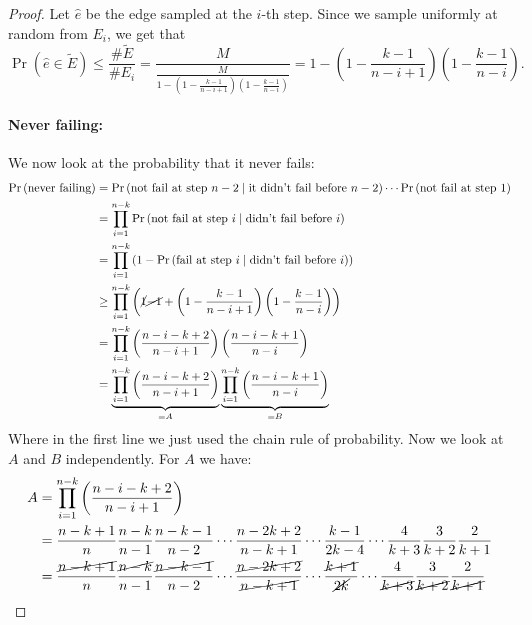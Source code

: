 \documentclass[11pt]{article}
\begin{document}
\begin{enumerate}
\begin{proof}
        Let $\hat e$ be the edge sampled at the $i$-th step. Since we sample uniformly at random from $E_i$, we get that
        \begin{equation*}
            \Pr\left(\hat e \in \tilde E\right) \leq \frac{\#\tilde E}{\# E_i}=\frac{M}{\frac{M}{1-\left(1-\frac{k-1}{n-i+1}\right)\left(1-\frac{k-1}{n-i}\right)}} = 1-\left(1-\frac{k-1}{n-i+1}\right)\left(1-\frac{k-1}{n-i}\right).
        \end{equation*}
        \paragraph*{Never failing:} We now look at the probability that it never fails:
        \begin{align*}
            \Pr\left(\text{never failing}\right) &= \Pr\left(\text{not fail at step $n-2$}\mid \text{it didn't fail before $n-2$}\right) \cdots \Pr\left(\text{not fail at step $1$}\right)\\
            &=\prod_{i=1}^{n-k}\Pr\left(\text{not fail at step $i$}\mid \text{didn't fail before $i$}\right)\\
            & = \prod_{i=1}^{n-k}\left(1-\Pr\left(\text{fail at step $i$}\mid \text{didn't fail before $i$}\right)\right)\\
            & \geq \prod_{i=1}^{n-k}\left(\cancel{1}\cancel{-1}+\left(1-\frac{k-1}{n-i+1}\right)\left(1-\frac{k-1}{n-i}\right)\right) \\
            & = \prod_{i=1}^{n-k}\left(\frac{n-i-k+2}{n-i+1}\right)\left(\frac{n-i-k+1}{n-i}\right) \\
            & = \underbrace{\prod_{i=1}^{n-k}\left(\frac{n-i-k+2}{n-i+1}\right)}_{=A}\underbrace{\prod_{i=1}^{n-k}\left(\frac{n-i-k+1}{n-i}\right)}_{=B}
        \end{align*}
        Where in the first line we just used the chain rule of probability. Now we look at $A$ and $B$ independently. For $A$ we have:
        \begin{align*}
            A &= \prod_{i=1}^{n-k}\left(\frac{n-i-k+2}{n-i+1}\right)\\
            &= \frac{n-k+1}{n}\frac{n-k}{n-1}\frac{n-k-1}{n-2}\cdots \frac{n-2k+2}{n-k+1}\cdots \frac{k-1}{2k-4}\cdots \frac{4}{k+3}\frac{3}{k+2}\frac{2}{k+1}\\
            &= \frac{\cancel{n-k+1}}{n}\frac{\cancel{n-k}}{n-1}\frac{\cancel{n-k-1}}{n-2}\cdots \frac{\cancel{n-2k+2}}{\cancel{n-k+1}}\cdots \frac{\cancel{k+1}}{\cancel{2k}}\cdots \frac{4}{\cancel{k+3}}\frac{3}{\cancel{k+2}}\frac{2}{\cancel{k+1}}\\

\end{align*}
\end{proof}
\end{enumerate}
\end{document}
